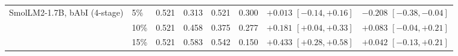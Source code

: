 \begin{table}[t]
\begin{tabular}{llccccll}
\addlinespace
SmolLM2-1.7B, bAbI (4-stage) & 5\% & 0.521 & 0.313 & 0.521 & 0.300 & $+0.013$ {\scriptsize $[-0.14, +0.16]$} & $\mathbf{-0.208}$ {\scriptsize $[-0.38, -0.04]$} \\
 & 10\% & 0.521 & 0.458 & 0.375 & 0.277 & $\mathbf{+0.181}$ {\scriptsize $[+0.04, +0.33]$} & $+0.083$ {\scriptsize $[-0.04, +0.21]$} \\
 & 15\% & 0.521 & 0.583 & 0.542 & 0.150 & $\mathbf{+0.433}$ {\scriptsize $[+0.28, +0.58]$} & $+0.042$ {\scriptsize $[-0.13, +0.21]$} \\
\bottomrule
\end{tabular}
\end{table}
